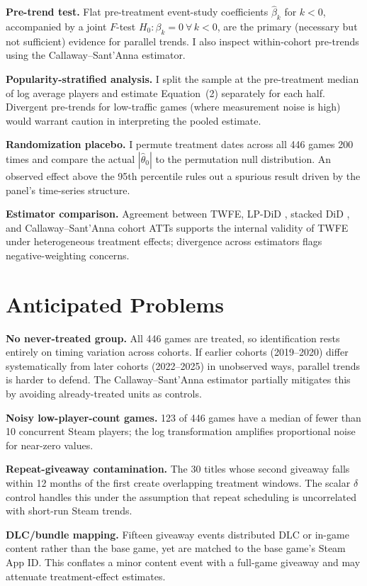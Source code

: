 \documentclass[11pt]{article}
\begin{document}
\textbf{Pre-trend test.} Flat pre-treatment event-study coefficients $\hat{\beta}_k$ for $k < 0$, accompanied by a joint $F$-test $H_0: \beta_k=0\ \forall\, k<0$, are the primary (necessary but not sufficient) evidence for parallel trends. I also inspect within-cohort pre-trends using the Callaway--Sant'Anna estimator.

\textbf{Popularity-stratified analysis.} I split the sample at the pre-treatment median of log average players and estimate Equation~(2) separately for each half. Divergent pre-trends for low-traffic games (where measurement noise is high) would warrant caution in interpreting the pooled estimate.

\textbf{Randomization placebo.} I permute treatment dates across all 446 games 200 times and compare the actual $|\hat{\theta}_0|$ to the permutation null distribution. An observed effect above the 95th percentile rules out a spurious result driven by the panel's time-series structure.

\textbf{Estimator comparison.} Agreement between TWFE, LP-DiD \citep{dube2023}, stacked DiD \citep{cengiz2019}, and Callaway--Sant'Anna cohort ATTs \citep{callaway2021} supports the internal validity of TWFE under heterogeneous treatment effects; divergence across estimators flags negative-weighting concerns.

\section{Anticipated Problems}

\textbf{No never-treated group.} All 446 games are treated, so identification rests entirely on timing variation across cohorts. If earlier cohorts (2019--2020) differ systematically from later cohorts (2022--2025) in unobserved ways, parallel trends is harder to defend. The Callaway--Sant'Anna estimator partially mitigates this by avoiding already-treated units as controls.

\textbf{Noisy low-player-count games.} 123 of 446 games have a median of fewer than 10 concurrent Steam players; the log transformation amplifies proportional noise for near-zero values.

\textbf{Repeat-giveaway contamination.} The 30 titles whose second giveaway falls within 12 months of the first create overlapping treatment windows. The scalar $\delta$ control handles this under the assumption that repeat scheduling is uncorrelated with short-run Steam trends.

\textbf{DLC/bundle mapping.} Fifteen giveaway events distributed DLC or in-game content rather than the base game, yet are matched to the base game's Steam App ID. This conflates a minor content event with a full-game giveaway and may attenuate treatment-effect estimates.
\end{document}
